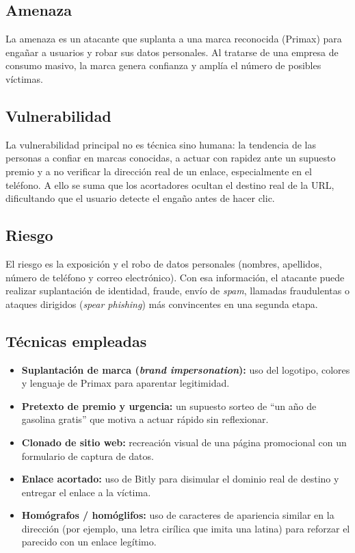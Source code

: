 \documentclass[12pt,a4paper]{article}
\begin{document}
\subsection{Amenaza}

La amenaza es un atacante que suplanta a una marca reconocida (Primax) para engañar a usuarios y robar sus datos personales. Al tratarse de una empresa de consumo masivo, la marca genera confianza y amplía el número de posibles víctimas.

\subsection{Vulnerabilidad}

La vulnerabilidad principal no es técnica sino humana: la tendencia de las personas a confiar en marcas conocidas, a actuar con rapidez ante un supuesto premio y a no verificar la dirección real de un enlace, especialmente en el teléfono. A ello se suma que los acortadores ocultan el destino real de la URL, dificultando que el usuario detecte el engaño antes de hacer clic.

\subsection{Riesgo}

El riesgo es la exposición y el robo de datos personales (nombres, apellidos, número de teléfono y correo electrónico). Con esa información, el atacante puede realizar suplantación de identidad, fraude, envío de \textit{spam}, llamadas fraudulentas o ataques dirigidos (\textit{spear phishing}) más convincentes en una segunda etapa.

\subsection{Técnicas empleadas}

\begin{itemize}[leftmargin=1.5cm]
  \item \textbf{Suplantación de marca (\textit{brand impersonation}):} uso del logotipo, colores y lenguaje de Primax para aparentar legitimidad.
  \item \textbf{Pretexto de premio y urgencia:} un supuesto sorteo de ``un año de gasolina gratis'' que motiva a actuar rápido sin reflexionar.
  \item \textbf{Clonado de sitio web:} recreación visual de una página promocional con un formulario de captura de datos.
  \item \textbf{Enlace acortado:} uso de Bitly para disimular el dominio real de destino y entregar el enlace a la víctima.
  \item \textbf{Homógrafos / homóglifos:} uso de caracteres de apariencia similar en la dirección (por ejemplo, una letra cirílica que imita una latina) para reforzar el parecido con un enlace legítimo.
\end{itemize}
\end{document}

